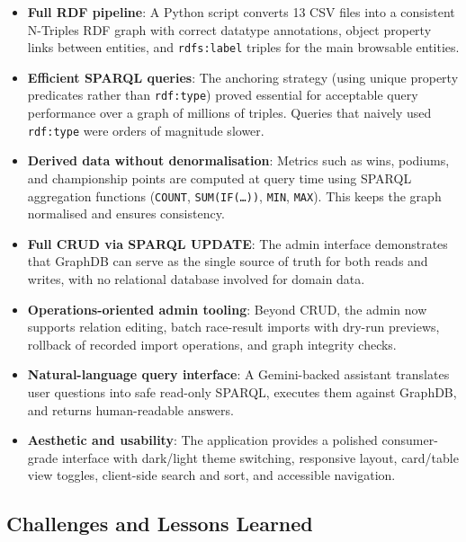 \documentclass[12pt,a4paper]{article}
\begin{document}
\begin{itemize}[leftmargin=1.5em]
  \item \textbf{Full RDF pipeline}: A Python script converts 13 CSV files into
        a consistent N-Triples RDF graph with correct datatype annotations,
        object property links between entities, and \texttt{rdfs:label} triples
        for the main browsable entities.

  \item \textbf{Efficient SPARQL queries}: The anchoring strategy (using unique
        property predicates rather than \texttt{rdf:type}) proved essential for
        acceptable query performance over a graph of millions of triples. Queries
        that naively used \texttt{rdf:type} were orders of magnitude slower.

  \item \textbf{Derived data without denormalisation}: Metrics such as wins,
        podiums, and championship points are computed at query time using SPARQL
        aggregation functions (\texttt{COUNT}, \texttt{SUM(IF(\ldots))},
        \texttt{MIN}, \texttt{MAX}). This keeps the graph normalised and ensures
        consistency.

  \item \textbf{Full CRUD via SPARQL UPDATE}: The admin interface demonstrates
        that GraphDB can serve as the single source of truth for both reads and
        writes, with no relational database involved for domain data.

  \item \textbf{Operations-oriented admin tooling}: Beyond CRUD, the admin now
        supports relation editing, batch race-result imports with dry-run
        previews, rollback of recorded import operations, and graph integrity
        checks.

  \item \textbf{Natural-language query interface}: A Gemini-backed assistant
        translates user questions into safe read-only SPARQL, executes them
        against GraphDB, and returns human-readable answers.

  \item \textbf{Aesthetic and usability}: The application provides a polished
        consumer-grade interface with dark/light theme switching, responsive
        layout, card/table view toggles, client-side search and sort, and
        accessible navigation.
\end{itemize}

\subsection{Challenges and Lessons Learned}
\end{document}

